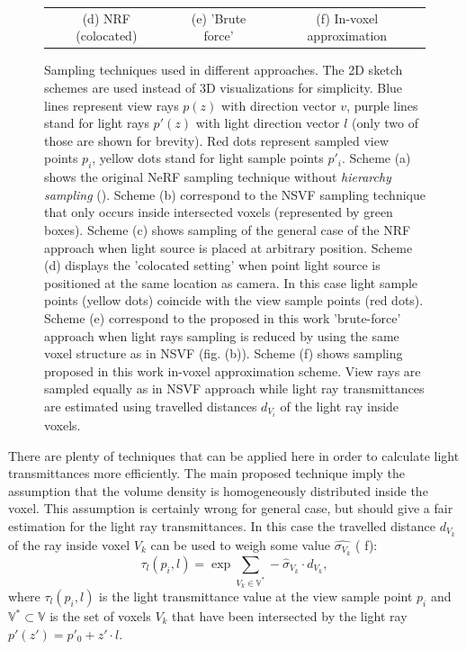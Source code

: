 \begin{figure}[!htbp]
\begin{tabular}{ccc}
          \\(d) NRF (colocated) & (e) 'Brute force'& (f) In-voxel approximation
    \end{tabular}
    \caption{
Sampling techniques used in different approaches.
The 2D sketch schemes are used instead of 3D visualizations for simplicity.
Blue lines represent view rays $p(z)$ with direction vector $v$,
purple lines stand for light rays $p'(z)$ with light direction vector $l$
(only two of those are shown for brevity).
Red dots represent sampled view points $p_i$, yellow dots stand for light sample points $p'_i$.
Scheme (a) shows the original NeRF sampling technique without \textit{hierarchy sampling} ().
Scheme (b) correspond to the NSVF sampling technique
that only occurs inside intersected voxels (represented by green boxes).
Scheme (c) shows sampling of the general case of the NRF approach
when light source is placed at arbitrary position.
Scheme (d) displays the 'colocated setting'
when point light source is positioned at the same location as camera.
In this case light sample points (yellow dots) coincide with the view sample points (red dots).
Scheme (e) correspond to the proposed in this work 'brute-force' approach
when light rays sampling is reduced by using the same voxel structure as in NSVF (fig. (b)).
Scheme (f) shows sampling proposed in this work in-voxel approximation scheme.
View rays are sampled equally as in NSVF approach
while light ray transmittances are estimated using travelled distances $d_{V_i}$
of the light ray inside voxels.
}
\label{fig:samplings}
\end{figure}

There are plenty of techniques that can be applied here in order to calculate light transmittances more efficiently.
The main proposed technique imply the assumption
that the volume density is homogeneously distributed inside the voxel.
This assumption is certainly wrong for general case,
but should give a fair estimation for the light ray transmittances.
In this case the travelled distance $d_{V_k}$ of the ray inside voxel $V_k$
can be used to weigh some value $\hat{\sigma_{V_k}}$ ( f):
\begin{equation}
    \label{eq:light_ray_transmittance}
    \tau_l(p_i, l) = \exp \sum_{V_k \in \mathbb{V}^*} -\hat{\sigma}_{V_k} \cdot d_{V_k},
\end{equation}
where $\tau_l(p_i, l)$ is the light transmittance value at the view sample point $p_i$
and $\mathbb{V}^* \subset \mathbb{V}$ is the set of voxels $V_k$
that have been intersected by the light ray $p'(z') = p'_0 + z' \cdot l$.


